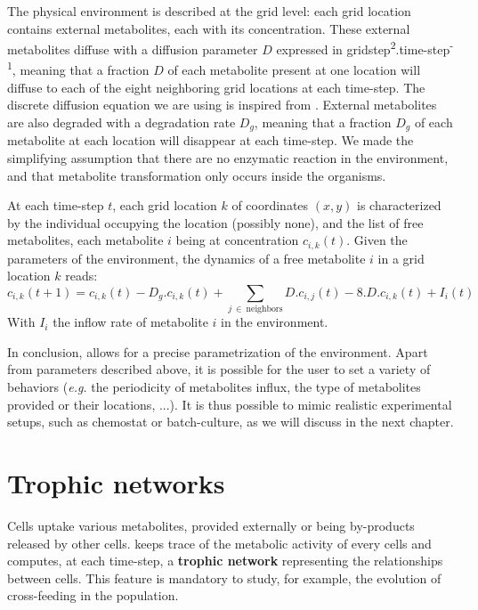 The physical environment is described at the grid level: each grid location contains external metabolites, each with its concentration.
These external metabolites diffuse with a diffusion parameter $D$ expressed in gridstep\textsuperscript{2}.time-step\textsuperscript{-1}, meaning that a fraction $D$ of each metabolite present at one location will diffuse to each of the eight neighboring grid locations at each time-step. The discrete diffusion equation we are using is inspired from \cite{frenoy-et-al-2013}. External metabolites are also degraded with a degradation rate $D_g$, meaning that a fraction $D_g$ of each metabolite at each location will disappear at each time-step. We made the simplifying assumption that there are no enzymatic reaction in the environment, and that metabolite transformation only occurs inside the organisms.

At each time-step $t$, each grid location $k$ of coordinates $(x,y)$ is characterized by the individual occupying the location (possibly none), and the list of free metabolites, each metabolite $i$ being at concentration $c_{i,k}(t)$. Given the parameters of the environment, the dynamics of a free metabolite $i$ in a grid location $k$ reads:
\begin{equation}
\label{eq:part2:methodology:environment}
c_{i,k}(t+1) = c_{i,k}(t) - D_g . c_{i,k}(t) + \sum_{j\ \in\ \text{neighbors}} D . c_{i,j}(t) - 8 . D . c_{i,k}(t) + I_i(t)
\end{equation}
With $I_i$ the inflow rate of metabolite $i$ in the environment.

In conclusion, {\EvoEvoSim} allows for a precise parametrization of the environment. Apart from parameters described above, it is possible for the user to set a variety of behaviors (\textit{e.g.} the periodicity of metabolites influx, the type of metabolites provided or their locations, ...). It is thus possible to mimic realistic experimental setups, such as chemostat or batch-culture, as we will discuss in the next chapter.


\section{Trophic networks}
\label{sec:part2:methodology:trophic_networks}

Cells uptake various metabolites, provided externally or being by-products released by other cells. {\EvoEvoSim} keeps trace of the metabolic activity of every cells and computes, at each time-step, a \textbf{trophic network} representing the relationships between cells. This feature is mandatory to study, for example, the evolution of cross-feeding in the population. 

